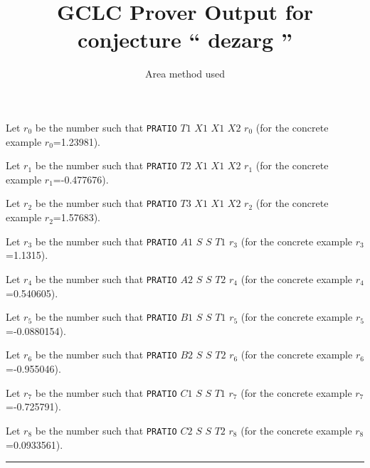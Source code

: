 \documentclass[a4paper]{article}
\begin{document}
	Let $r_{0}$ be the number such that {\tt PRATIO} $T1$ $X1$ $X1$ $X2$ $r_{0}$ (for the concrete example $r_{0}$=1.23981).

	Let $r_{1}$ be the number such that {\tt PRATIO} $T2$ $X1$ $X1$ $X2$ $r_{1}$ (for the concrete example $r_{1}$=-0.477676).

	Let $r_{2}$ be the number such that {\tt PRATIO} $T3$ $X1$ $X1$ $X2$ $r_{2}$ (for the concrete example $r_{2}$=1.57683).

	Let $r_{3}$ be the number such that {\tt PRATIO} $A1$ $S$ $S$ $T1$ $r_{3}$ (for the concrete example $r_{3}$=1.1315).

	Let $r_{4}$ be the number such that {\tt PRATIO} $A2$ $S$ $S$ $T2$ $r_{4}$ (for the concrete example $r_{4}$=0.540605).

	Let $r_{5}$ be the number such that {\tt PRATIO} $B1$ $S$ $S$ $T1$ $r_{5}$ (for the concrete example $r_{5}$=-0.0880154).

	Let $r_{6}$ be the number such that {\tt PRATIO} $B2$ $S$ $S$ $T2$ $r_{6}$ (for the concrete example $r_{6}$=-0.955046).

	Let $r_{7}$ be the number such that {\tt PRATIO} $C1$ $S$ $S$ $T1$ $r_{7}$ (for the concrete example $r_{7}$=-0.725791).

	Let $r_{8}$ be the number such that {\tt PRATIO} $C2$ $S$ $S$ $T2$ $r_{8}$ (for the concrete example $r_{8}$=0.0933561).

\vspace*{2mm} \hrule \vspace*{2mm} 
\title{GCLC Prover Output for conjecture `` dezarg '' }

\author{Area method used}

\maketitle
\end{document}
